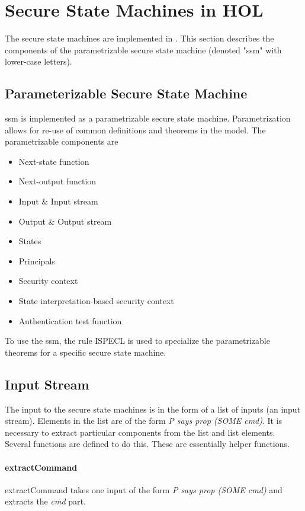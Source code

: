 \documentclass[../../main/main.tex]{subfiles}
\begin{document}
\section{Secure State Machines in HOL}\label{sec:sminHOL}
The secure state machines are implemented in .  This section describes the components of the parametrizable secure state machine (denoted "ssm" with lower-case letters).

\subsection{Parameterizable Secure State Machine}
ssm is implemented as a parametrizable secure state machine. Parametrization allows for re-use of common definitions and theorems in the  model.  The parametrizable components are
\begin{itemize}
\item Next-state function
\item Next-output function
\item Input \& Input stream
\item Output \& Output stream
\item States
\item Principals
\item Security context
\item State interpretation-based security context
\item Authentication test function
\end{itemize}

To use the ssm, the rule ISPECL  is used to specialize the parametrizable theorems for a specific secure state machine. 

\subsection{Input Stream}
The input to the secure state machines is in the form of a list of inputs (an input stream).  Elements in the list are of the form \textit{P says prop (SOME cmd)}.  It is necessary to extract particular components from the list and list elements.  Several functions are defined to do this.  These are essentially helper functions.

\paragraph*{extractCommand}
extractCommand takes one input of the form \textit{P says prop (SOME cmd)} and extracts the \textit{cmd} part.
\end{document}
